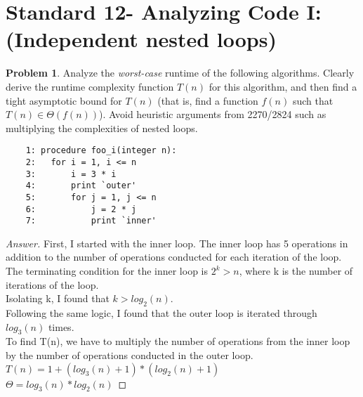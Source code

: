 \documentclass[11pt]{article}
\theoremstyle{definition}
\theoremstyle{definition}
\newtheorem{required}{Problem}
\theoremstyle{definition}
\begin{document}
\newpage
\section{Standard 12- Analyzing Code I: (Independent nested loops)}
\begin{required}


Analyze the \textit{worst-case} runtime of the following algorithms. Clearly derive the runtime complexity function $T(n)$ for this algorithm, and then find a tight asymptotic bound for $T(n)$ (that is, find a function $f(n)$ such that $T(n) \in \Theta(f(n))$). Avoid heuristic arguments from 2270/2824 such as multiplying the complexities of nested loops.

\begin{verbatim}
	1: procedure foo_i(integer n):
	2:   for i = 1, i <= n
	3:       i = 3 * i
	4:       print `outer'
	5:       for j = 1, j <= n 
	6:           j = 2 * j
	7:           print `inner'
\end{verbatim}


\begin{proof}[Answer]

First, I started with the inner loop. The inner loop has 5 operations in addition to the number of operations conducted for each iteration of the loop.\\
The terminating condition for the inner loop is $2^k > n$, where k is the number of iterations of the loop. \\
Isolating k, I found that $k > log_2(n)$.\\
Following the same logic, I found that the outer loop is iterated through $log_3(n)$ times. \\
To find T(n), we have to multiply the number of operations from the inner loop by the number of operations conducted in the outer loop. \\
$T(n) = 1 + (log_3(n) +1) * (log_2(n)+1)$ \\
$\Theta = log_3(n)*log_2(n)$



\end{proof}
\end{required}


\newpage
\end{document}
